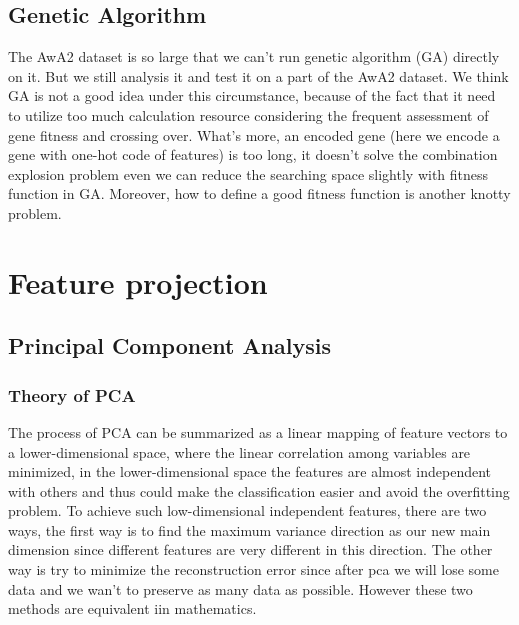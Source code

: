 \documentclass{article}
\begin{document}
\subsection{Genetic Algorithm}
The AwA2 dataset is so large that we can't run genetic algorithm (GA) directly on it. But we still analysis it and test it on a part of the AwA2 dataset. We think GA is not a good idea under this circumstance, because of the fact that it need to utilize too much calculation resource considering the frequent assessment of gene fitness and crossing over. What's more, an encoded gene (here we encode a gene with one-hot code of features) is too long, it doesn't solve the combination explosion problem even we can reduce the searching space slightly with fitness function in GA. Moreover, how to define a good fitness function is another knotty problem.


\section{Feature projection}
\label{sec:projection}
\subsection{Principal Component Analysis}
\subsubsection{Theory of PCA}
    The process of PCA can be summarized as a linear mapping of feature vectors to a lower-dimensional space, where the linear correlation among variables are minimized, in the lower-dimensional space the features are almost independent with others and thus could make the classification easier and avoid the overfitting problem. To achieve such low-dimensional independent features, there are two ways, the first way is to find the maximum variance direction as our new main dimension since different features are very different in this direction. The other way is try to minimize the reconstruction error since after pca we will lose some data and we wan't to preserve as many data as possible. However these two methods are equivalent iin mathematics.
    
\end{document}
